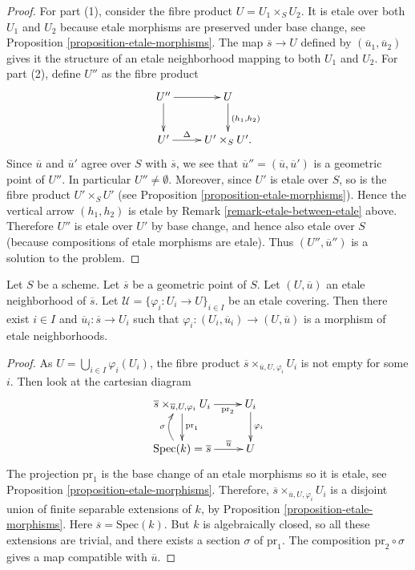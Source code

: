 \begin{proof}
For part (1), consider the fibre product $U = U_1 \times_S U_2$.
It is etale over both $U_1$ and $U_2$ because etale morphisms are
preserved under base change, see
Proposition \ref{proposition-etale-morphisms}.
The map $\overline{s} \to U$ defined by $(\overline{u}_1, \overline{u}_2)$
gives it the structure of an etale neighborhood mapping to both
$U_1$ and $U_2$. For part (2), define $U''$ as the fibre product
$$
\xymatrix{
U'' \ar[r] \ar[d] & U \ar^{(h_1,h_2)}[d] \\
U' \ar^-\Delta[r] & U' \times_S U'.
}
$$
Since $\overline{u}$ and $\overline{u}'$ agree over $S$ with $\overline{s}$,
we see that $\overline{u}'' = (\overline{u}, \overline{u}')$ is a geometric
point of $U''$. In particular $U'' \not = \emptyset$.
Moreover, since $U'$ is etale over $S$, so is the fibre product
$U'\times_S U'$ (see
Proposition \ref{proposition-etale-morphisms}).
Hence the vertical arrow $(h_1, h_2)$ is etale by
Remark \ref{remark-etale-between-etale} above.
Therefore $U''$ is etale over $U'$ by base change, and hence also
etale over $S$ (because compositions of etale morphisms are etale).
Thus $(U'', \overline{u}'')$ is a solution to the problem.
\end{proof}

\begin{lemma}
\label{lemma-geometric-lift-to-cover}
Let $S$ be a scheme.
Let $\overline{s}$ be a geometric point of $S$.
Let $(U, \overline{u})$ an etale neighborhood of $\overline{s}$.
Let $\mathcal{U} = \{\varphi_i : U_i \to U \}_{i\in I}$ be an etale covering.
Then there exist $i \in I$ and $\overline{u}_i : \overline{s} \to U_i$
such that $\varphi_i : (U_i, \overline{u}_i) \to (U, \overline{u})$
is a morphism of etale neighborhoods.
\end{lemma}

\begin{proof}
As $U = \bigcup_{i\in I} \varphi_i(U_i)$, the fibre product
$\overline{s} \times_{\overline{u}, U, \varphi_i} U_i$ is not empty
for some $i$. Then look at the cartesian diagram
$$
\xymatrix{
\overline{s} \times_{\overline{u}, U, \varphi_i} U_i
\ar[d]^{\text{pr}_1} \ar[r]_-{\text{pr}_2} & U_i
\ar[d]^{\varphi_i} \\
\text{Spec}(k) = \overline{s} \ar@/^1pc/[u]^\sigma
\ar[r]^-{\overline{u}} & U
}
$$
The projection $\text{pr}_1$ is the base change of an etale morphisms so it
is etale, see
Proposition \ref{proposition-etale-morphisms}.
Therefore, $\overline{s} \times_{\overline{u}, U, \varphi_i} U_i$
is a disjoint union of finite separable extensions of $k$, by
Proposition \ref{proposition-etale-morphisms}. Here
$\overline{s} = \text{Spec}(k)$. But $k$ is algebraically closed, so all
these extensions are trivial, and there exists a section $\sigma$ of
$\text{pr}_1$. The composition
$\text{pr}_2 \circ \sigma$ gives a map compatible with $\overline{u}$.
\end{proof}

